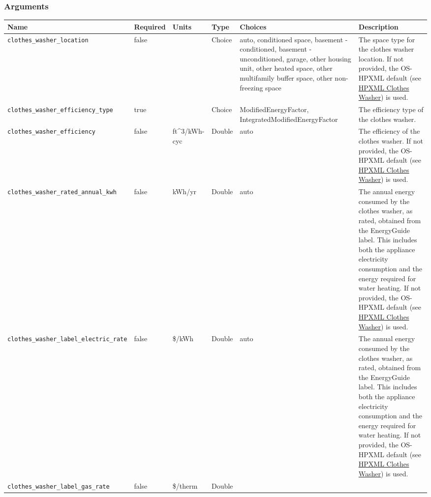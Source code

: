 \subsubsection{Arguments}\label{arguments-8}

\begin{longtable}[]{@{}llllll@{}}
\toprule\noalign{}
Name & Required & Units & Type & Choices & Description \\
\midrule\noalign{}
\endhead
\bottomrule\noalign{}
\endlastfoot
\texttt{clothes\_washer\_location} & false & & Choice & auto,
conditioned space, basement - conditioned, basement - unconditioned,
garage, other housing unit, other heated space, other multifamily buffer
space, other non-freezing space & The space type for the clothes washer
location. If not provided, the OS-HPXML default (see
\href{https://openstudio-hpxml.readthedocs.io/en/v1.7.0/workflow_inputs.html\#hpxml-clothes-washer}{HPXML
Clothes Washer}) is used. \\
\texttt{clothes\_washer\_efficiency\_type} & true & & Choice &
ModifiedEnergyFactor, IntegratedModifiedEnergyFactor & The efficiency
type of the clothes washer. \\
\texttt{clothes\_washer\_efficiency} & false & ft\^{}3/kWh-cyc & Double
& auto & The efficiency of the clothes washer. If not provided, the
OS-HPXML default (see
\href{https://openstudio-hpxml.readthedocs.io/en/v1.7.0/workflow_inputs.html\#hpxml-clothes-washer}{HPXML
Clothes Washer}) is used. \\
\texttt{clothes\_washer\_rated\_annual\_kwh} & false & kWh/yr & Double &
auto & The annual energy consumed by the clothes washer, as rated,
obtained from the EnergyGuide label. This includes both the appliance
electricity consumption and the energy required for water heating. If
not provided, the OS-HPXML default (see
\href{https://openstudio-hpxml.readthedocs.io/en/v1.7.0/workflow_inputs.html\#hpxml-clothes-washer}{HPXML
Clothes Washer}) is used. \\
\texttt{clothes\_washer\_label\_electric\_rate} & false & \$/kWh &
Double & auto & The annual energy consumed by the clothes washer, as
rated, obtained from the EnergyGuide label. This includes both the
appliance electricity consumption and the energy required for water
heating. If not provided, the OS-HPXML default (see
\href{https://openstudio-hpxml.readthedocs.io/en/v1.7.0/workflow_inputs.html\#hpxml-clothes-washer}{HPXML
Clothes Washer}) is used. \\
\texttt{clothes\_washer\_label\_gas\_rate} & false & \$/therm & Double &

\end{longtable}
